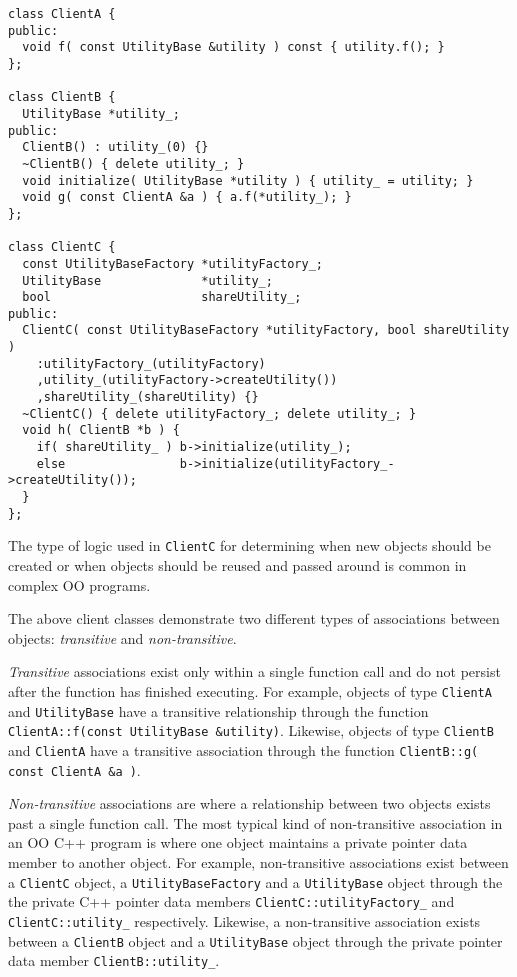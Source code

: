 \documentclass[pdf,ps2pdf,11pt]{SANDreport}
\begin{document}
{\small\begin{verbatim}
class ClientA {
public:
  void f( const UtilityBase &utility ) const { utility.f(); }
};

class ClientB {
  UtilityBase *utility_;
public:
  ClientB() : utility_(0) {}
  ~ClientB() { delete utility_; }
  void initialize( UtilityBase *utility ) { utility_ = utility; }
  void g( const ClientA &a ) { a.f(*utility_); }
};

class ClientC {
  const UtilityBaseFactory *utilityFactory_;
  UtilityBase              *utility_;
  bool                     shareUtility_;
public:
  ClientC( const UtilityBaseFactory *utilityFactory, bool shareUtility )
    :utilityFactory_(utilityFactory)
    ,utility_(utilityFactory->createUtility())
    ,shareUtility_(shareUtility) {}
  ~ClientC() { delete utilityFactory_; delete utility_; }
  void h( ClientB *b ) {
    if( shareUtility_ ) b->initialize(utility_);
    else                b->initialize(utilityFactory_->createUtility());
  }
};
\end{verbatim}}

The type of logic used in {}\texttt{ClientC} for determining when new
objects should be created or when objects should be reused and passed
around is common in complex OO programs.

The above client classes demonstrate two different types of
associations between objects: {}\textit{transitive} and
{}\textit{non-transitive}.

{}\textit{Transitive} associations exist only within a single function
call and do not persist after the function has finished executing.
For example, objects of type {}\texttt{Client\-A} and
{}\texttt{Utility\-Base} have a transitive relationship through the
function {}\texttt{ClientA\-::f(const UtilityBase \&utility)}.
Likewise, objects of type {}\texttt{Client\-B} and
{}\texttt{Client\-A} have a transitive association through the
function {}\texttt{ClientB\-::g( const ClientA
\&a )}.

{}\textit{Non-transitive} associations are where a relationship
between two objects exists past a single function call.  The most
typical kind of non-transitive association in an OO C++ program is
where one object maintains a private pointer data member to another
object.  For example, non-transitive associations exist between a
{}\texttt{ClientC} object, a {}\texttt{Utility\-Base\-Factory} and a
{}\texttt{Utility\-Base} object through the the private C++ pointer
data members {}\texttt{ClientC\-::utility\-Factory\_} and
{}\texttt{ClientC\-::utility\_} respectively.  Likewise, a
non-transitive association exists between a {}\texttt{ClientB} object
and a {}\texttt{Utility\-Base} object through the private pointer data
member {}\texttt{ClientB\-::utility\_}.
\end{document}
